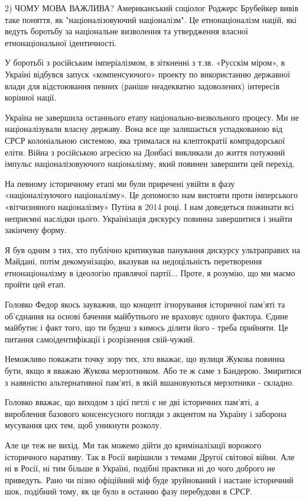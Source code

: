 2) ЧОМУ МОВА ВАЖЛИВА? Американський соціолог Роджерс Брубейкер вивів таке
поняття, як "націоналізовуючий націоналізм". Це етнонаціоналізм націй, які
ведуть боротьбу за національне визволення та утвердження власної
етнонаціональної ідентичності. 

У боротьбі з російським імперіалізмом, в зіткненні з т.зв. «Русскім міром», в
Україні відбувся запуск «компенсуючого» проекту по використанню державної влади
для відстоювання певних (раніше неадекватно задоволених) інтересів корінної
нації.

Україна не завершила останнього етапу національно-визвольного процесу. Ми не
націоналізували власну державу. Вона все ще залишається успадкованою від СРСР
колоніальною системою, яка трималася на клептократії компрадорської еліти.
Війна з російською агресією на Донбасі викликали до життя потужний імпульс
націоналізовуючого націоналізму, який повинен завершити цей перехід.

На певному історичному етапі ми були приречені увійти в фазу «націоналізуючого
націоналізму». Це допомогло нам вистояти проти імперського «вітчизняного
націоналізму» Путіна в 2014 році. І нам доведеться пожинати всі неприємні
наслідки цього. Українізація дискурсу повинна завершитися і знайти закінчену
форму. 

Я був одним з тих, хто публічно критикував панування дискурсу ультраправих на
Майдані, потім декомунізацію, вказував на недоцільність перетворення
етнонаціоналізму в ідеологію правлячої партії... Проте, я розумію, що ми маємо
пройти цей етап. 

Головко Федор якось зауважив, що концепт ігнорування історичної пам'яті та
об'єднання на основі бачення майбутнього не враховує одного фактора. Єдине
майбутнє і факт того, що ти будеш з кимось ділити його - треба прийняти. Це
питання самоідентифікації і розрізнення свій-чужий.

Неможливо поважати точку зору тих, хто вважає, що вулиця Жукова повинна бути,
якщо я вважаю Жукова мерзотником. Або те ж саме з Бандерою. Змиритися з
наявністю альтернативної пам'яті, в якій вшановуються мерзотники - складно.

Головко вважає, що виходом з цієї петлі є не дві історичних пам'яті, а
вироблення базового консенсусного погляди з акцентом на Україну і заборона
мусування цих тем, щоб уникнути розколу.

Але це теж не вихід. Ми так можемо дійти до криміналізації ворожого історичного
наративу. Так в Росії вирішили з темами Другої світової війни. Але ні в Росії,
ні тим більше в Україні, подібні практики ні до чого доброго не приведуть. Рано
чи пізно офіційний міф буде зруйнований і настане історичний шок, подібний
тому, як це було в останню фазу перебудови в СРСР.

